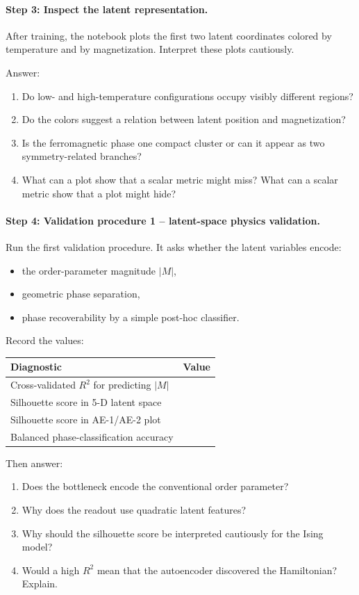 \documentclass[11pt]{article}
\begin{document}
\paragraph{Step 3: Inspect the latent representation.}
After training, the notebook plots the first two latent coordinates colored by temperature and by magnetization. Interpret these plots cautiously.

Answer:
\begin{enumerate}
    \item Do low- and high-temperature configurations occupy visibly different regions?
    \item Do the colors suggest a relation between latent position and magnetization?
    \item Is the ferromagnetic phase one compact cluster or can it appear as two symmetry-related branches?
    \item What can a plot show that a scalar metric might miss? What can a scalar metric show that a plot might hide?
\end{enumerate}

\paragraph{Step 4: Validation procedure 1 -- latent-space physics validation.}
Run the first validation procedure. It asks whether the latent variables encode:
\begin{itemize}
    \item the order-parameter magnitude \(|M|\),
    \item geometric phase separation,
    \item phase recoverability by a simple post-hoc classifier.
\end{itemize}

Record the values:
\begin{center}
\begin{tabular}{l l}
\hline
Diagnostic & Value \\
\hline
Cross-validated \(R^2\) for predicting \(|M|\) & \\
Silhouette score in 5-D latent space & \\
Silhouette score in AE-1/AE-2 plot & \\
Balanced phase-classification accuracy & \\
\hline
\end{tabular}
\end{center}

Then answer:
\begin{enumerate}
    \item Does the bottleneck encode the conventional order parameter?
    \item Why does the readout use quadratic latent features?
    \item Why should the silhouette score be interpreted cautiously for the Ising model?
    \item Would a high \(R^2\) mean that the autoencoder discovered the Hamiltonian? Explain.
\end{enumerate}
\end{document}
